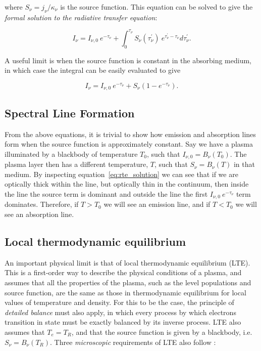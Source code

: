 where $S_\nu=j_\nu/\kappa_\nu$ is the source function. This equation
can be solved to give the {\em formal solution to the radiative transfer equation}:

\begin{equation}
I_\nu = I_{\nu,0}~e^{-\tau_\nu} + \int^{\tau_\nu}_0 S_\nu (\tau^\prime_\nu)~e^{\tau^\prime_\nu-\tau_\nu} d \tau^\prime_\nu.
\label{eq:rte_solution}
\end{equation}

A useful limit is when the source function is constant in the absorbing medium, in which case
the integral can be easily evaluated to give

\begin{equation}
I_\nu = I_{\nu,0}~e^{-\tau_\nu} + S_\nu (1 - e^{-\tau_\nu}).
\label{eq:rte_solution}
\end{equation}




\subsection{Spectral Line Formation}

From the above equations, it is trivial to show how emission and absorption lines form when
the source function is approximately constant.
Say we have a plasma illuminated by a blackbody of temperature $T_0$, such that
$I_{\nu,0} = B_\nu (T_0)$. The plasma layer then has a different temperature, $T$,
such that $S_\nu = B_\nu (T)$ in that medium. By inspecting equation~\ref{eq:rte_solution}
we can see that if we are optically thick within the line, but optically
thin in the continuum, then inside the line the source term is dominant and outside 
the line the first $I_{\nu,0}~e^{-\tau_\nu}$ term dominates. Therefore, if $T > T_0$ we will 
see an emission line, and if $T < T_0$ we will see an absorption line. 

\subsection{Local thermodynamic equilibrium}
\label{sec:lte}


An important physical limit is that of local thermodynamic equilibrium (LTE).
This is a first-order way to describe the physical conditions of a plasma, and assumes
that all the properties of the plasma, such as the level populations and source function,
are the same as those in thermodynamic equilibrium for local values of 
temperature and density. For this to be the case, the principle of 
{\em detailed balance} must also apply, in which every 
process by which electrons transition in state must be exactly 
balanced by its inverse process. LTE also assumes that $T_e = T_R$, and that
the source function is given by a blackbody, i.e. $S_\nu = B_\nu (T_R)$.
Three {\em microscopic} 
requirements of LTE also follow \citep{mihalas}:

